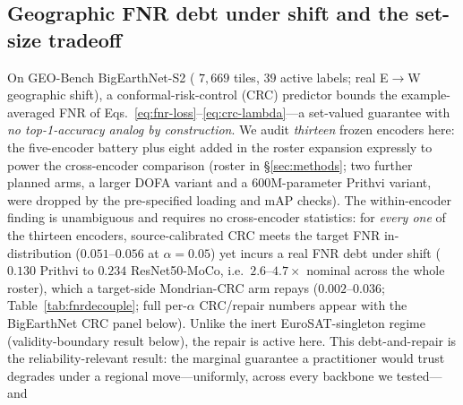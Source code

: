 \documentclass[preprint,11pt,authoryear]{elsarticle}
\begin{document}
\subsection*{Geographic FNR debt under shift and the set-size tradeoff}
On GEO-Bench BigEarthNet-S2 ( $7{,}669$ tiles, $39$ active labels; real E$\to$W
geographic shift), a conformal-risk-control (CRC) predictor \citep{angelopoulos2024crc} bounds the
example-averaged FNR of Eqs.~\eqref{eq:fnr-loss}--\eqref{eq:crc-lambda}---a set-valued guarantee with
\emph{no top-1-accuracy analog by construction}.
We audit \emph{thirteen} frozen encoders here: the five-encoder battery plus eight added in the roster expansion
expressly to power the cross-encoder comparison (roster in \S\ref{sec:methods}; two further planned arms,
a larger DOFA variant and a 600M-parameter Prithvi variant, were dropped by the pre-specified loading and mAP checks).
The within-encoder finding is unambiguous and requires no cross-encoder statistics: for \emph{every one}
of the thirteen encoders, source-calibrated CRC meets the target FNR in-distribution ($0.051$--$0.056$ at
$\alpha{=}0.05$) yet incurs a real FNR debt under shift ($0.130$ Prithvi to $0.234$ ResNet50-MoCo, i.e.\
$2.6$--$4.7\times$ nominal across the whole roster), which a target-side Mondrian-CRC arm repays
($0.002$--$0.036$; Table~\ref{tab:fnrdecouple}; full per-$\alpha$ CRC/repair numbers appear with the BigEarthNet CRC panel below). Unlike the inert EuroSAT-singleton regime (validity-boundary result below), the
repair is active here. This debt-and-repair is the reliability-relevant result: the marginal guarantee a
practitioner would trust degrades under a regional move---uniformly, across every backbone we tested---and
\end{document}

